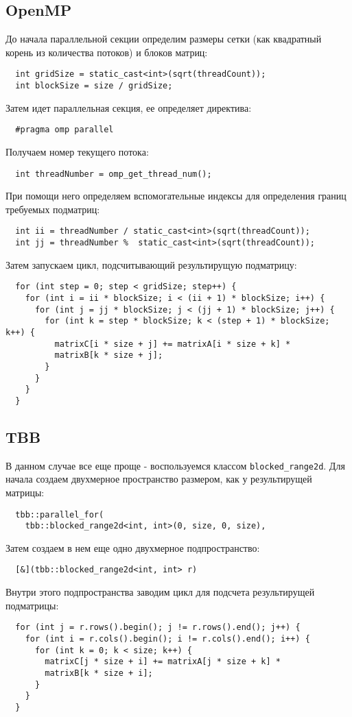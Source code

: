 \documentclass{article}
\begin{document}
\subsection*{OpenMP}
\setcounter{subsection}{1}
До начала параллельной секции определим размеры сетки (как квадратный корень из количества потоков) и блоков матриц:
\begin{lstlisting}
  int gridSize = static_cast<int>(sqrt(threadCount));
  int blockSize = size / gridSize;
\end{lstlisting}
Затем идет параллельная секция, ее определяет директива:
\begin{lstlisting}
  #pragma omp parallel
\end{lstlisting}
Получаем номер текущего потока:
\begin{lstlisting}
  int threadNumber = omp_get_thread_num();
\end{lstlisting}
При помощи него определяем вспомогательные индексы для определения границ требуемых подматриц:
\begin{lstlisting}
  int ii = threadNumber / static_cast<int>(sqrt(threadCount));
  int jj = threadNumber %  static_cast<int>(sqrt(threadCount));
\end{lstlisting}
Затем запускаем цикл, подсчитывающий результирущую подматрицу:
\begin{lstlisting}
  for (int step = 0; step < gridSize; step++) {
    for (int i = ii * blockSize; i < (ii + 1) * blockSize; i++) {
      for (int j = jj * blockSize; j < (jj + 1) * blockSize; j++) {
        for (int k = step * blockSize; k < (step + 1) * blockSize; k++) {
          matrixC[i * size + j] += matrixA[i * size + k] *
          matrixB[k * size + j];
        }
      }
    }
  }
\end{lstlisting}
\newpage

\subsection*{TBB}
В данном случае все еще проще - воспользуемся классом \lstinline$blocked_range2d$.
Для начала создаем двухмерное пространство размером, как у результирущей матрицы:
\begin{lstlisting}
  tbb::parallel_for(
    tbb::blocked_range2d<int, int>(0, size, 0, size),
\end{lstlisting}
Затем создаем в нем еще одно двухмерное подпространство:
\begin{lstlisting}
  [&](tbb::blocked_range2d<int, int> r)
\end{lstlisting}
Внутри этого подпространства заводим цикл для подсчета результирущей подматрицы:
\begin{lstlisting}
  for (int j = r.rows().begin(); j != r.rows().end(); j++) {
    for (int i = r.cols().begin(); i != r.cols().end(); i++) {
      for (int k = 0; k < size; k++) {
        matrixC[j * size + i] += matrixA[j * size + k] *
        matrixB[k * size + i];
      }          
    }
  }
\end{lstlisting} 
\newpage
\end{document}
